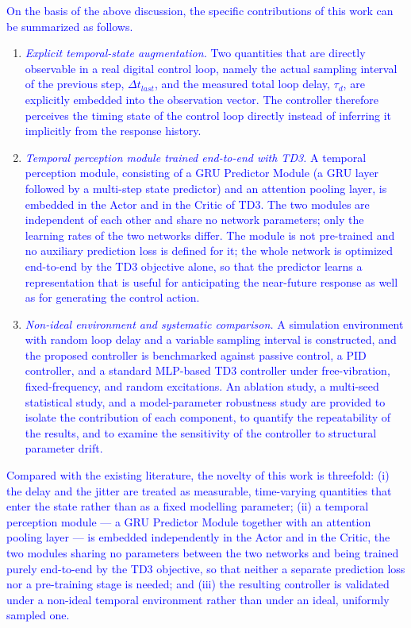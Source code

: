 \documentclass[review]{elsarticle}
\begin{document}
\textcolor{blue}{On the basis of the above discussion, the specific contributions of this work can be summarized as follows.}
\begin{enumerate}
\item \textcolor{blue}{\emph{Explicit temporal-state augmentation.} Two quantities that are directly observable in a real digital control loop, namely the actual sampling interval of the previous step, $\Delta t_{last}$, and the measured total loop delay, $\tau_{d}$, are explicitly embedded into the observation vector. The controller therefore perceives the timing state of the control loop directly instead of inferring it implicitly from the response history.}
\item \textcolor{blue}{\emph{Temporal perception module trained end-to-end with TD3.} A temporal perception module, consisting of a GRU Predictor Module (a GRU layer followed by a multi-step state predictor) and an attention pooling layer, is embedded in the Actor and in the Critic of TD3. The two modules are independent of each other and share no network parameters; only the learning rates of the two networks differ. The module is not pre-trained and no auxiliary prediction loss is defined for it; the whole network is optimized end-to-end by the TD3 objective alone, so that the predictor learns a representation that is useful for anticipating the near-future response as well as for generating the control action.}
\item \textcolor{blue}{\emph{Non-ideal environment and systematic comparison.} A simulation environment with random loop delay and a variable sampling interval is constructed, and the proposed controller is benchmarked against passive control, a PID controller, and a standard MLP-based TD3 controller under free-vibration, fixed-frequency, and random excitations. An ablation study, a multi-seed statistical study, and a model-parameter robustness study are provided to isolate the contribution of each component, to quantify the repeatability of the results, and to examine the sensitivity of the controller to structural parameter drift.}
\end{enumerate}
\textcolor{blue}{Compared with the existing literature, the novelty of this work is threefold: (i) the delay and the jitter are treated as measurable, time-varying quantities that enter the state rather than as a fixed modelling parameter; (ii) a temporal perception module --- a GRU Predictor Module together with an attention pooling layer --- is embedded independently in the Actor and in the Critic, the two modules sharing no parameters between the two networks and being trained purely end-to-end by the TD3 objective, so that neither a separate prediction loss nor a pre-training stage is needed; and (iii) the resulting controller is validated under a non-ideal temporal environment rather than under an ideal, uniformly sampled one.}
\end{document}
